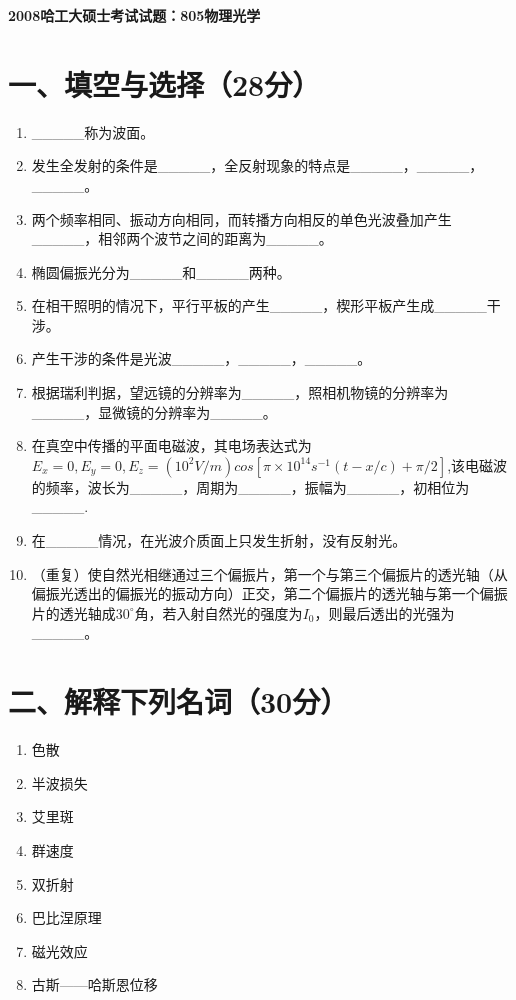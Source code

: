 \documentclass[12pt, a4paper]{article}
\theoremstyle{solution}
\begin{document}
\begin{center}
\Large\textbf{2008哈工大硕士考试试题：805物理光学}
\end{center}




\section*{一、填空与选择（28分）}
\begin{enumerate}
    \item \_\_\_\_\_称为波面。
    \item 发生全发射的条件是\_\_\_\_\_，全反射现象的特点是\_\_\_\_\_，\_\_\_\_\_，\_\_\_\_\_。
    \item 两个频率相同、振动方向相同，而转播方向相反的单色光波叠加产生\_\_\_\_\_，相邻两个波节之间的距离为\_\_\_\_\_。
    \item 椭圆偏振光分为\_\_\_\_\_和\_\_\_\_\_两种。
    \item 在相干照明的情况下，平行平板的产生\_\_\_\_\_，楔形平板产生成\_\_\_\_\_干涉。
    \item 产生干涉的条件是光波\_\_\_\_\_，\_\_\_\_\_，\_\_\_\_\_。
    \item 根据瑞利判据，望远镜的分辨率为\_\_\_\_\_，照相机物镜的分辨率为\_\_\_\_\_，显微镜的分辨率为\_\_\_\_\_。
    \item 在真空中传播的平面电磁波，其电场表达式为$E_x=0,E_y=0,E_z=(10^2V/m)cos[\pi\times10^{14}s^{-1}(t-x/c)+\pi/2]$,该电磁波的频率，波长为\_\_\_\_\_，周期为\_\_\_\_\_，振幅为\_\_\_\_\_，初相位为\_\_\_\_\_.
    \item 在\_\_\_\_\_情况，在光波介质面上只发生折射，没有反射光。
    \item （重复）使自然光相继通过三个偏振片，第一个与第三个偏振片的透光轴（从偏振光透出的偏振光的振动方向）正交，第二个偏振片的透光轴与第一个偏振片的透光轴成$30^\circ$角，若入射自然光的强度为$I_0$，则最后透出的光强为\_\_\_\_\_。
\end{enumerate}
\section*{二、解释下列名词（30分）}
\begin{enumerate}
    \item 色散
    \item 半波损失
    \item 艾里斑
    \item 群速度
    \item 双折射
    \item 巴比涅原理
    \item 磁光效应
    \item 古斯——哈斯恩位移
\end{enumerate}
\end{document}
